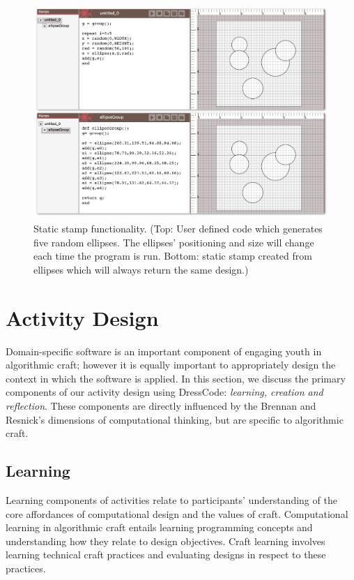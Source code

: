 \documentclass{sigchi}
\begin{document}
\begin{center}
\begin{figure}[h!]
\includegraphics[width=\columnwidth]{images/stamps.jpg}
\caption{Static stamp functionality. (Top: User defined code which generates five random ellipses. The ellipses' positioning and size will change each time the program is run. Bottom: static stamp created from ellipses which will always return the same design.)}
\label{fig:stamps}
\end{figure}
\end{center}
\vspace{-20pt}

\section{Activity Design}
Domain-specific software is an important component of engaging youth in algorithmic craft; however it is equally important to appropriately design the context in which the software is applied. In this section, we discuss the primary components of our activity design using DressCode: \emph{learning, creation and reflection}. These components are directly influenced by the Brennan and Resnick's dimensions of computational thinking\cite{computational_thinking}, but are specific to algorithmic craft.

\subsection{Learning}
Learning components of activities relate to participants' understanding of the core affordances of computational design and the values of craft. Computational learning in algorithmic craft entails learning programming concepts and understanding how they relate to design objectives. Craft learning involves learning technical craft practices and evaluating designs in respect to these practices.
\end{document}
